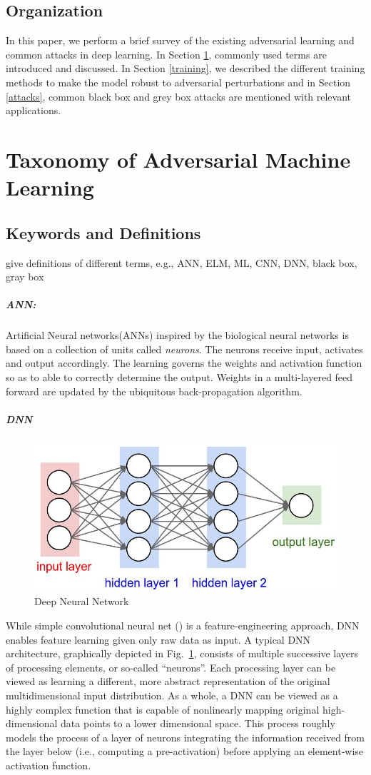 \documentclass[a4paper]{article}
\newcommand{\ach}[1]{{\color{red}#1}}
\begin{document}
\subsection*{Organization}
In this paper, we perform a brief survey of the existing adversarial learning and common attacks in deep learning. In Section \ref{taxonomy}, commonly used terms are introduced and discussed. In Section \ref{training}, we described the different training methods to make the model robust to adversarial perturbations and in Section \ref{attacks}, common black box and grey box attacks are mentioned with relevant applications.
\section{Taxonomy of Adversarial Machine Learning}\label{taxonomy}

\subsection{Keywords and Definitions}
\ach{give definitions of different terms, e.g., ANN, ELM, ML, CNN, DNN, black box, gray box}
\subparagraph{ANN:}Artificial Neural networks(ANNs) inspired by the biological neural networks is based on a collection of units called \emph{neurons}. The neurons receive input, activates and output accordingly. The learning governs the weights and activation function so as to able to correctly determine the output. Weights in a multi-layered feed forward are updated by the ubiquitous back-propagation algorithm.

\subparagraph{DNN}
\begin{figure}[h!]
	\centering
	\includegraphics[width=0.9\columnwidth]{dnn}
	\caption{Deep Neural Network}
	\label{fig:dnn}
\end{figure}
While simple convolutional neural net () is a feature-engineering approach, DNN enables feature learning given only raw data as input.
A typical DNN architecture, graphically depicted in Fig.~\ref{fig:dnn}, consists of multiple successive layers of processing elements, or so-called “neurons”. Each processing layer can be viewed as learning a different, more abstract representation of the original multidimensional input distribution. As a whole, a DNN can be viewed as a highly complex function that is capable of nonlinearly mapping original high-dimensional data points to a lower dimensional space.  This process roughly models the process of a layer of neurons integrating the information received from the layer below (i.e., computing a pre-activation) before applying an element-wise activation function.
\end{document}
